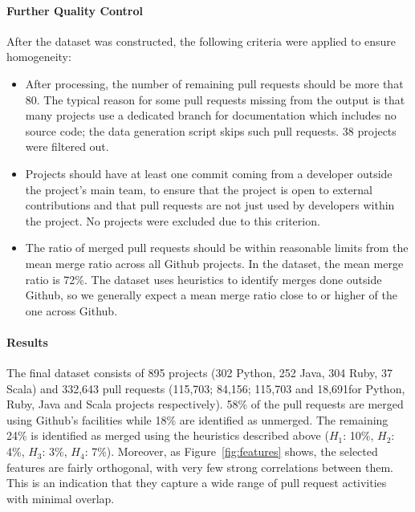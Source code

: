 \documentclass{sig-alternate}
\begin{document}
\paragraph*{Further Quality Control}
After the dataset was constructed, the following criteria were applied to 
ensure homogeneity:

\begin{itemize}

  \item After processing, the number of remaining pull requests should be more
    that 80. The typical reason for some pull requests missing from the output
    is that many projects use a dedicated branch for documentation which
    includes no source code; the data generation script skips such pull
    requests. 38 projects were filtered out.

  \item Projects should have at least one commit coming from a developer outside
    the project's main team, to ensure that the project is open to external
    contributions and that pull requests are not just used by developers within
    the project. No projects were excluded due to this criterion. 

  \item The ratio of merged pull requests should be within reasonable limits
    from the mean merge ratio across all Github projects. In the \ghtorrent
    dataset, the mean merge ratio is 72\%. The \pullreqs dataset uses heuristics
    to identify merges done outside Github, so we generally expect a mean merge
    ratio close to or higher of the one across Github.

\end{itemize}

\paragraph*{Results} The final dataset consists of 895 projects (302 Python, 252 Java, 304 Ruby, 37
Scala) and 332,643 pull requests (115,703; 84,156; 115,703 and 18,691for Python,
Ruby, Java and Scala projects respectively). 58\% of the pull requests are
merged using Github's facilities while 18\% are identified as unmerged.
The remaining 24\% is identified as merged using the heuristics described
above ($H_1$: 10\%, $H_2$: 4\%, $H_3$: 3\%, $H_4$: 7\%).
Moreover, as Figure~\ref{fig:features} shows,
the selected features are fairly orthogonal, with very few strong correlations
between them. This is an indication that they capture a wide range of pull
request activities with minimal overlap.
\end{document}
